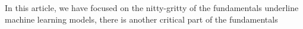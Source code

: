 In this article, we have focused on the nitty-gritty of the fundamentals underline machine learning models, there is another critical part of the fundamentals 